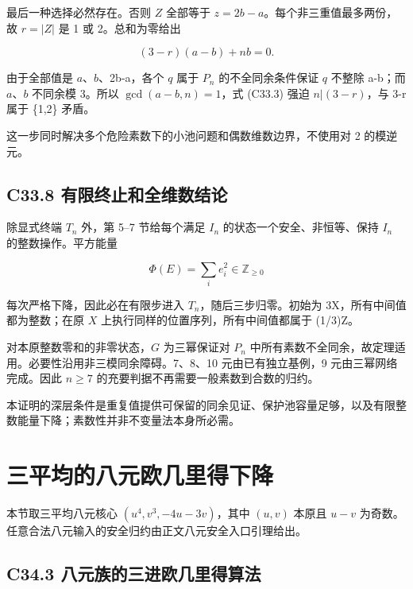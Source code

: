 \documentclass[11pt,a4paper]{article}
\theoremstyle{definition}
\numberwithin{equation}{section}
\begin{document}
{最后一种选择必然存在。否则} {\ensuremath{Z}} {全部等于} {\ensuremath{z=2b-a}。每个非三重值最多两份，故} {\ensuremath{r=|Z|}} {是} {1} {或} {2。总和为零给出}

\[
(3-r)(a-b)+nb=0.
\tag{C33.3}
\]

{由于全部值是} {\ensuremath{a}、\ensuremath{b}、2b-a，各个} {\ensuremath{q}} {属于} {\ensuremath{P_{n}}} {的不全同余条件保证} {\ensuremath{q}} {不整除} {a-b；而} {\ensuremath{a}、\ensuremath{b}} {不同余模} {3。所以} {\ensuremath{\operatorname{gcd}(a-b,n)=1}，式} {(C33.3)} {强迫} {\ensuremath{n|(3-r)}，与} {3-r} {属于} {\{1,2\}} {矛盾。}

{这一步同时解决多个危险素数下的小池问题和偶数维数边界，不使用对} {2} {的模逆元。}

\subsection*{\texorpdfstring{{C33.8} {有限终止和全维数结论}}{C33.8 有限终止和全维数结论}}\label{C33-h225}

{除显式终端} {\ensuremath{T_{n}}} {外，第} {5--7} {节给每个满足} {\ensuremath{I_{n}}} {的状态一个安全、非恒等、保持} {\ensuremath{I_{n}}} {的整数操作。平方能量}

\[
\Phi(E)=\sum_i e_i^2\in\mathbb Z_{\ge0}
\]

{每次严格下降，因此必在有限步进入} {\ensuremath{T_{n}}，随后三步归零。初始为} {3X，所有中间值都为整数；在原} {\ensuremath{X}} {上执行同样的位置序列，所有中间值都属于} {(1/3)Z。}

{对本原整数零和的非零状态，\ensuremath{G}} {为三幂保证对} {\ensuremath{P_{n}}} {中所有素数不全同余，故定理适用。必要性沿用非三模同余障碍。7、8、10} {元由已有独立基例，9} {元由三幂网络完成。因此} {\ensuremath{n\ge 7}} {的充要判据不再需要一般素数到合数的归约。}

{本证明的深层条件是重复值提供可保留的同余见证、保护池容量足够，以及有限整数能量下降；素数性并非不变量法本身所必需。}


\section{三平均的八元欧几里得下降}\label{construct:triple-small}
{本节取三平均八元核心} \((u^4,v^3,-4u-3v)\){，其中} \((u,v)\) {本原且} \(u-v\) {为奇数。任意合法八元输入的安全归约由正文八元安全入口引理给出。}

\subsection*{\texorpdfstring{{C34.3} {八元族的三进欧几里得算法}}{C34.3 八元族的三进欧几里得算法}}\label{C34-h226}
\end{document}

